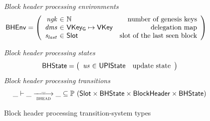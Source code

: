 \documentclass[11pt,a4paper]{article}
\newcommand{\powerset}[1]{\mathbb{P}~#1}
\newcommand{\var}[1]{\mathit{#1}}
\newcommand{\type}[1]{\mathsf{#1}}
\newcommand{\trans}[2]{\xlongrightarrow[\textsc{#1}]{#2}}
\newcommand{\Slot}{\type{Slot}}
\newcommand{\VKey}{\type{VKey}}
\newcommand{\VKeyGen}{\type{VKey_G}}
\begin{document}
\begin{figure}[ht]
  \emph{Block header processing environments}
  \begin{align*}
    & \BHEnv
      = \left(
      \begin{array}{r@{~\in~}lr}
        \var{ngk} & \mathbb{N} & \text{number of genesis keys}\\
        \var{dms} & \VKeyGen \mapsto \VKey & \text{delegation map}\\
        \var{s_{last}} & \Slot & \text{slot of the last seen block}
      \end{array}\right)
  \end{align*}

  \emph{Block header processing states}
  \begin{equation*}
    \BHState =
    \left(
      \begin{array}{r@{~\in~}lr}
        \var{us} & \UPIState & \text{update state}
      \end{array}
    \right)
  \end{equation*}
  \emph{Block header processing transitions}
  \begin{equation*}
    \var{\_} \vdash \var{\_} \trans{bhead}{\_} \var{\_} \subseteq
    \powerset (\Slot \times \BHState \times \Bhead \times \BHState)
  \end{equation*}
  \caption{Block header processing transition-system types}
  \label{fig:ts-types:bhead}
\end{figure}
\end{document}
